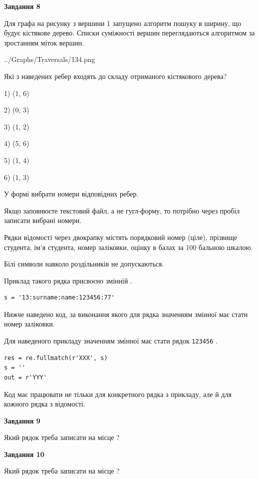 \documentclass[12pt, ukrainian]{article}
\def\code#1{\Verb!#1!}
\begin{document}
{\begin {large}
{\begin {center}\textbf{Завдання 8}\end {center}}\par
Для графа на рисунку з вершини 1 запущено алгоритм пошуку в ширину, що будує кістякове дерево. Списки суміжності вершин переглядаються алгоритмом за зростанням міток вершин.\par
\begin{center}
	{../Graphs/Traversals/134.png}
\end{center}
\par Які з наведених ребер входять до складу отриманого кістякового дерева?\par
1) (1, 6)\par
2) (0, 3)\par
3) (1, 2)\par
4) (5, 6)\par
5) (1, 4)\par
6) (1, 3)\par
{\vskip 15pt} У формі вибрати номери відповідних ребер.


Якщо заповнюєте текстовий файл, а не гугл-форму, то потрібно через пробіл записа\-ти вибрані номери.\par
\newpage


Рядки відомості через двокрапку містять порядковий номер (ціле), пріз\-ви\-ще студен\-та, ім'я студента, номер заліковки, оцінку в балах за 100 бальною шкалою.

Білі символи навколо роздільників не допускаються.

Приклад такого рядка присвоєно змінній .



\begin{verbatim}
s = '13:surname:name:123456:77'
\end{verbatim}


Нижче наведено код, за виконання якого для рядка  значенням змінної  має стати номер заліковки.

Для наведеного прикладу значенням змінної  має стати рядок \code{123456} .



\begin{verbatim}
res = re.fullmatch(r'XXX', s)
s = ''
out = r'YYY'
\end{verbatim}


Код має працювати не тільки для конкретного рядка з прикладу, але й для кожного рядка з відомості.

{\begin {center}\textbf{Завдання 9}\end {center}}\par
Який рядок треба записати на місце  ?\par
\vspace{5mm}


{\begin {center}\textbf{Завдання 10}\end {center}}\par
Який рядок треба записати на місце  ?\par


\newpage


\end {large}}
\end{document}
